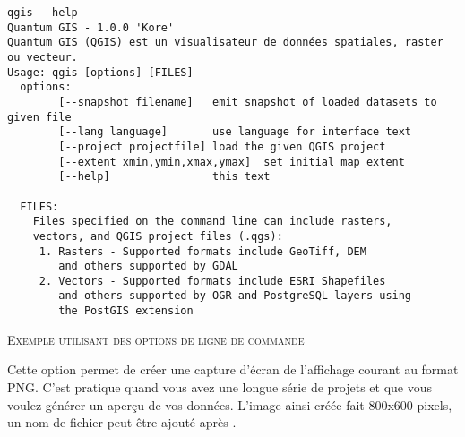 \small
\begin{verbatim}
qgis --help
Quantum GIS - 1.0.0 'Kore'
Quantum GIS (QGIS) est un visualisateur de données spatiales, raster ou vecteur.
Usage: qgis [options] [FILES]
  options:
        [--snapshot filename]   emit snapshot of loaded datasets to given file
        [--lang language]       use language for interface text
        [--project projectfile] load the given QGIS project
        [--extent xmin,ymin,xmax,ymax]  set initial map extent
        [--help]                this text

  FILES:
    Files specified on the command line can include rasters,
    vectors, and QGIS project files (.qgs):
     1. Rasters - Supported formats include GeoTiff, DEM
        and others supported by GDAL
     2. Vectors - Supported formats include ESRI Shapefiles
        and others supported by OGR and PostgreSQL layers using
        the PostGIS extension
\end{verbatim}
\normalsize


\begin{Astuce} \caption{\textsc{Exemple utilisant des options de ligne de commande}}
\end{Astuce}

%

Cette option permet de créer une capture d'écran de l'affichage courant au format PNG. C'est pratique quand vous avez une longue série de projets et que vous voulez générer un aperçu de vos données. L'image ainsi créée fait 800x600 pixels, un nom de fichier peut être ajouté après .

